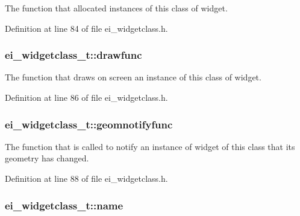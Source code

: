 The function that allocated instances of this class of widget. 



Definition at line 84 of file ei\-\_\-widgetclass.\-h.

\hypertarget{structei__widgetclass__t_a528168099a2a1515c4cf65400ccbfff2}{
\subsubsection[{drawfunc}]{ ei\-\_\-widgetclass\-\_\-t\-::drawfunc}}\label{structei__widgetclass__t_a528168099a2a1515c4cf65400ccbfff2}


The function that draws on screen an instance of this class of widget. 



Definition at line 86 of file ei\-\_\-widgetclass.\-h.

\hypertarget{structei__widgetclass__t_aaf0aa3f54a48a6b3f8b8e12574ede4b7}{
\subsubsection[{geomnotifyfunc}]{ ei\-\_\-widgetclass\-\_\-t\-::geomnotifyfunc}}\label{structei__widgetclass__t_aaf0aa3f54a48a6b3f8b8e12574ede4b7}


The function that is called to notify an instance of widget of this class that its geometry has changed. 



Definition at line 88 of file ei\-\_\-widgetclass.\-h.

\hypertarget{structei__widgetclass__t_aa5799b5999890cf04915bf0fe5151ec8}{
\subsubsection[{name}]{ ei\-\_\-widgetclass\-\_\-t\-::name}}\label{structei__widgetclass__t_aa5799b5999890cf04915bf0fe5151ec8}


